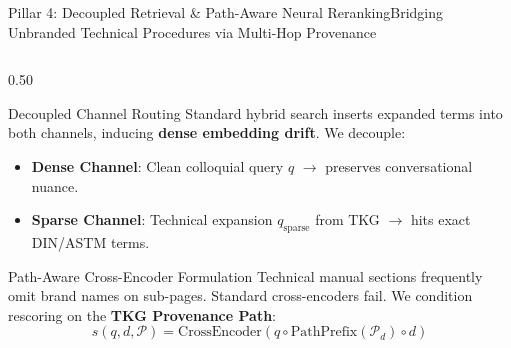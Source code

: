 \documentclass[aspectratio=169,10pt]{beamer}
\begin{document}
\begin{frame}{Pillar 4: Decoupled Retrieval \& Path-Aware Neural Reranking}{Bridging Unbranded Technical Procedures via Multi-Hop Provenance}
  \begin{columns}[T]
    \begin{column}{0.50\textwidth}
      \begin{block}{Decoupled Channel Routing}
        \scriptsize
        Standard hybrid search inserts expanded terms into both channels, inducing \textbf{dense embedding drift}. We decouple:
        \begin{itemize}\setlength\itemsep{0.03ex}
          \item \textbf{Dense Channel}: Clean colloquial query $q$ $\to$ preserves conversational nuance.
          \item \textbf{Sparse Channel}: Technical expansion $q_{\text{sparse}}$ from TKG $\to$ hits exact DIN/ASTM terms.
        \end{itemize}
      \end{block}

      \begin{block}{Path-Aware Cross-Encoder Formulation}
        \scriptsize
        Technical manual sections frequently omit brand names on sub-pages. Standard cross-encoders fail. We condition rescoring on the \textbf{TKG Provenance Path}:
        \begin{equation*}
          s(q, d, \mathcal{P}) = \text{CrossEncoder}(q \circ \text{PathPrefix}(\mathcal{P}_d) \circ d)
        \end{equation*}
      \end{block}
    \end{column}


\end{columns}
\end{frame}
\end{document}
